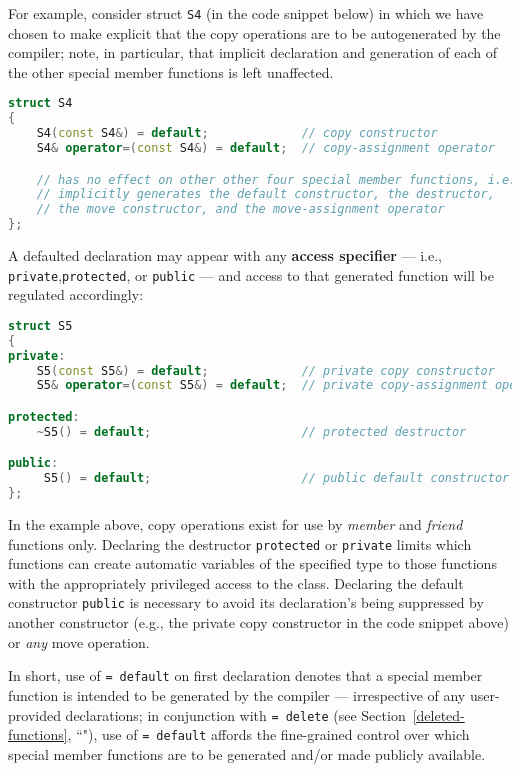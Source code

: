 For example, consider struct \texttt{S4} (in the code snippet below) in which we have chosen
to make explicit that the copy operations are to be autogenerated by
the compiler; note, in particular, that implicit declaration and generation
of each of the other special member functions is left unaffected.

\begin{lstlisting}[language=C++]
struct S4
{
    S4(const S4&) = default;             // copy constructor
    S4& operator=(const S4&) = default;  // copy-assignment operator

    // has no effect on other other four special member functions, i.e.,
    // implicitly generates the default constructor, the destructor,
    // the move constructor, and the move-assignment operator
};
\end{lstlisting}

\noindent A defaulted declaration may appear with any \textbf{access specifier} ---
i.e., \texttt{private},\linebreak[4] \texttt{protected}, or \texttt{public} --- and access to that generated function will be regulated accordingly:

\begin{lstlisting}[language=C++]
struct S5
{
private:
    S5(const S5&) = default;             // private copy constructor
    S5& operator=(const S5&) = default;  // private copy-assignment operator

protected:
    ~S5() = default;                     // protected destructor

public:
     S5() = default;                     // public default constructor
};
\end{lstlisting}

\noindent In the example above, copy operations exist for use by \emph{member} and
\emph{friend} functions only. Declaring the destructor
\texttt{protected} or \texttt{private} limits which functions can create
automatic variables of the specified type to those functions with the
appropriately privileged access to the class. Declaring the default
constructor \texttt{public} is necessary to avoid its declaration's
being suppressed by another constructor (e.g., the private copy
constructor in the code snippet above) or \emph{any} move operation.

In short, use of \texttt{=}~\texttt{default} on first declaration
denotes that a special member function is intended to be generated by
the compiler --- irrespective of any user-provided declarations; in
conjunction with {\texttt{=}~\texttt{delete}} (see Section~\ref{deleted-functions}, ``"),
use of
\texttt{=}~\texttt{default} affords the fine-grained control over which
special member functions are to be generated and/or made publicly
available.


